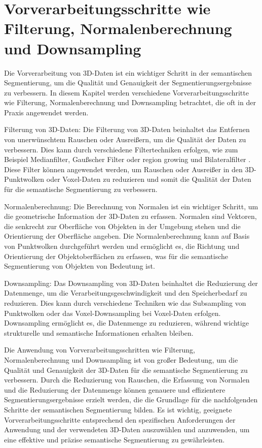 \section{Vorverarbeitungsschritte wie Filterung, Normalenberechnung und Downsampling}

Die Vorverarbeitung von 3D-Daten ist ein wichtiger Schritt in der semantischen
Segmentierung, um die Qualität und Genauigkeit der Segmentierungsergebnisse zu
verbessern. In diesem Kapitel werden verschiedene Vorverarbeitungsschritte wie
Filterung, Normalenberechnung und Downsampling betrachtet, die oft in der
Praxis angewendet werden.

Filterung von 3D-Daten: Die Filterung von 3D-Daten beinhaltet das Entfernen von
unerwünschtem Rauschen oder Ausreißern, um die Qualität der Daten zu
verbessern. Dies kann durch verschiedene Filtertechniken erfolgen, wie zum
Beispiel Medianfilter, Gaußscher Filter \cite{9191237} oder region growing und
Bilateralfilter \cite{6460813}. Diese Filter können angewendet werden, um
Rauschen oder Ausreißer in den 3D-Punktwolken oder Voxel-Daten zu reduzieren
und somit die Qualität der Daten für die semantische Segmentierung zu
verbessern.

Normalenberechnung: Die Berechnung von Normalen ist ein wichtiger Schritt, um
die geometrische Information der 3D-Daten zu erfassen. Normalen sind Vektoren,
die senkrecht zur Oberfläche von Objekten in der Umgebung stehen und die
Orientierung der Oberfläche angeben. Die Normalenberechnung kann auf Basis von
Punktwolken durchgeführt werden und ermöglicht es, die
Richtung und Orientierung der Objektoberflächen zu erfassen, was für die
semantische Segmentierung von Objekten von Bedeutung ist.

Downsampling: Das Downsampling von 3D-Daten beinhaltet die Reduzierung der
Datenmenge, um die Verarbeitungsgeschwindigkeit und den Speicherbedarf zu
reduzieren. Dies kann durch verschiedene Techniken wie das Subsampling von
Punktwolken oder das Voxel-Downsampling bei Voxel-Daten erfolgen. Downsampling
ermöglicht es, die Datenmenge zu reduzieren, während wichtige strukturelle und
semantische Informationen erhalten bleiben.

Die Anwendung von Vorverarbeitungsschritten wie Filterung, Normalenberechnung
und Downsampling ist von großer Bedeutung, um die Qualität und Genauigkeit der
3D-Daten für die semantische Segmentierung zu verbessern. Durch die Reduzierung
von Rauschen, die Erfassung von Normalen und die Reduzierung der Datenmenge
können genauere und effizientere Segmentierungsergebnisse erzielt werden, die
die Grundlage für die nachfolgenden Schritte der semantischen Segmentierung
bilden. Es ist wichtig, geeignete Vorverarbeitungsschritte entsprechend den
spezifischen Anforderungen der Anwendung und der verwendeten 3D-Daten
auszuwählen und anzuwenden, um eine effektive und präzise semantische
Segmentierung zu gewährleisten.

